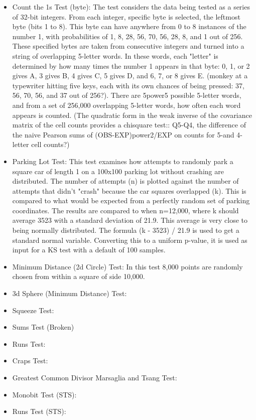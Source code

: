 \begin{itemize}
\item Count the 1s Test (byte): The test considers the data being tested as a series of 32-bit integers. From each integer, specific byte is selected, the leftmost byte (bits 1 to 8). This byte can have anywhere from 0 to 8 instances of the number 1, with probabilities of 1, 8, 28, 56, 70, 56, 28, 8, and 1 out of 256. These specified bytes are taken from consecutive integers and turned into a string of overlapping 5-letter words. In these words, each "letter" is determined by how many times the number 1 appears in that byte: 0, 1, or 2 gives A, 3 gives B, 4 gives C, 5 gives D, and 6, 7, or 8 gives E. (monkey at a typewriter hitting five keys, each with its own chances of being pressed: 37, 56, 70, 56, and 37 out of 256?). There are 5power5 possible 5-letter words, and from a set of 256,000 overlapping 5-letter words, how often each word appears is counted. (The quadratic form in the weak inverse of the covariance matrix of the cell counts provides a chisquare test::  Q5-Q4, the difference of the naive Pearson  sums of (OBS-EXP)power2/EXP on counts for 5-and 4-letter cell counts?)
\item Parking Lot Test: This test examines how attempts to randomly park a square car of length 1 on a 100x100 parking lot without crashing are distributed. The number of attempts (n) is plotted against the number of attempts that didn't "crash" because the car squares overlapped (k). This is compared to what would be expected from a perfectly random set of parking coordinates. The results are compared to when n=12,000, where k should average 3523 with a standard deviation of 21.9. This average is very close to being normally distributed. The formula (k - 3523) / 21.9 is used to get a standard normal variable. Converting this to a uniform p-value, it is used as input for a KS test with a default of 100 samples.
\item Minimum Distance (2d Circle) Test: In this test 8,000 points are randomly chosen from within a square of side 10,000. 
\item 3d Sphere (Minimum Distance) Test:
\item Squeeze Test:
\item Sums Test (Broken)
\item Runs Test:
\item Craps Test:
\item Greatest Common Divisor Marsaglia and Tsang Test:
\item Monobit Test (STS):
\item Runs Test (STS):

\end{itemize}
